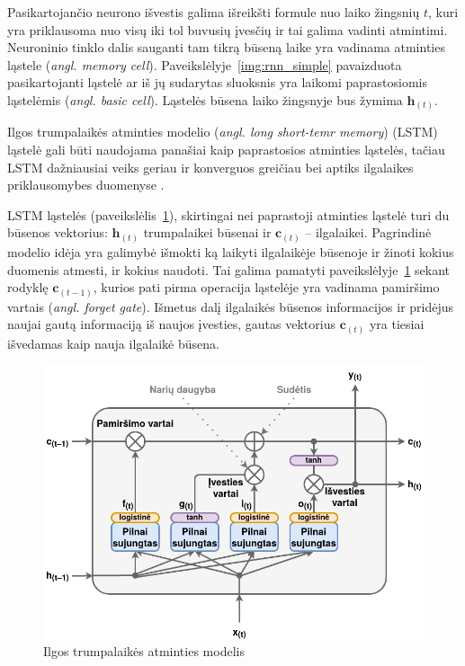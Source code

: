 \documentclass{VUMIFPSbakalaurinis}
\begin{document}
{	Pasikartojančio neurono išvestis galima išreikšti formule nuo laiko žingsnių \(t\), kuri yra priklausoma nuo visų iki tol buvusių įvesčių ir tai galima vadinti atmintimi. Neuroninio tinklo dalis sauganti tam tikrą būseną laike yra vadinama atminties ląstele (\textit{angl. memory cell}). Paveikslėlyje~\ref{img:rnn_simple} pavaizduota pasikartojanti ląstelė ar iš jų sudarytas sluoksnis yra laikomi paprastosiomis ląstelėmis (\textit{angl. basic cell}). Ląstelės būsena laiko žingsnyje bus žymima \(\mathbf{h}_{(t)}\).
}
\label{subsubsubsec:lstm}
{
	Ilgos trumpalaikės atminties modelio (\textit{angl. long short-temr memory}) (LSTM) ląstelė \cite{hochreiter_schmidhuber_1997, sak2014long} gali būti naudojama panašiai kaip paprastosios atminties ląstelės, tačiau LSTM dažniausiai veiks geriau ir konverguos greičiau bei aptiks ilgalaikes priklausomybes duomenyse \cite{handson}.\par
	
	LSTM ląstelės (paveikslėlis~\ref{img:lstm}), skirtingai nei paprastoji atminties ląstelė turi du būsenos vektorius: \(\mathbf{h}_{(t)}\) trumpalaikei būsenai ir  \(\mathbf{c}_{(t)}\) -- ilgalaikei. Pagrindinė modelio idėja yra galimybė išmokti ką laikyti ilgalaikėje būsenoje ir žinoti kokius duomenis atmesti, ir kokius naudoti. Tai galima pamatyti paveikslėlyje~\ref{img:lstm} sekant rodyklę \(\mathbf{c}_{(t-1)}\), kurios pati pirma operacija ląstelėje yra vadinama pamiršimo vartais (\textit{angl. forget gate}). Išmetus dalį ilgalaikės būsenos informacijos ir pridėjus naujai gautą informaciją iš naujos įvesties, gautas vektorius \(\mathbf{c}_{(t)}\) yra tiesiai išvedamas kaip nauja ilgalaikė būsena.
	
	\begin{figure}[H]
		\centering
		\includegraphics[scale=0.33]{img/lstm}
		\caption{Ilgos trumpalaikės atminties modelis}
		\label{img:lstm}
	\end{figure} 

}
\end{document}
